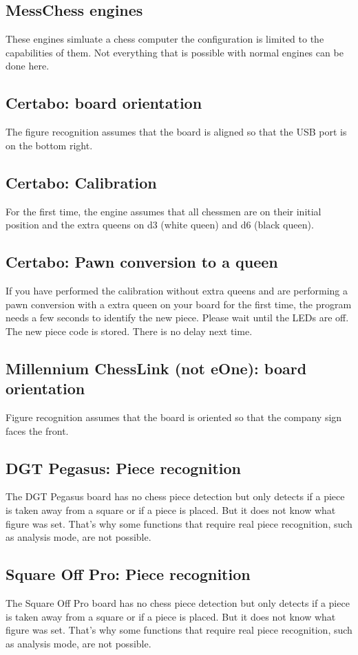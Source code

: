 \documentclass[11pt,a4paper]{article}
\begin{document}
\subsection{MessChess engines}
These engines simluate a chess computer the configuration is limited to the capabilities of them. Not everything that is possible with normal engines can be done here. 

\subsection{Certabo: board orientation}
The figure recognition assumes that the board is aligned so that the USB port is on the bottom right.

\subsection{Certabo: Calibration}
For the first time, the engine assumes that all chessmen are on their initial position and the extra queens on d3 (white queen) and d6 (black queen).

\subsection{Certabo: Pawn conversion to a queen}
If you have performed the calibration without extra queens and are performing a pawn conversion with a extra queen on your board for the first time, the program needs a few seconds to identify the new piece. Please wait until the LEDs are off. The new piece code is stored. There is no delay next time.

\subsection{Millennium ChessLink (not eOne): board orientation}
Figure recognition assumes that the board is oriented so that the company sign faces the front.

\subsection{DGT Pegasus: Piece recognition}
The DGT Pegasus board has no chess piece detection but only detects if a piece is taken away from a square or if a piece is placed. But it does not know what figure was set. That's why some functions that require real piece recognition, such as analysis mode, are not possible.

\subsection{Square Off Pro: Piece recognition}
The Square Off Pro board has no chess piece detection but only detects if a piece is taken away from a square or if a piece is placed. But it does not know what figure was set. That's why some functions that require real piece recognition, such as analysis mode, are not possible.
\end{document}
